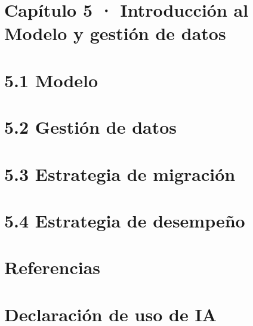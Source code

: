 \documentclass[11pt]{article}
\begin{document}
\tableofcontents
\clearpage

\section{Capítulo 5 · Introducción al Modelo y gestión de datos}\label{capuxedtulo-5-introducciuxf3n-al-modelo-y-gestiuxf3n-de-datos}

\section{5.1 Modelo}\label{modelo}

\section{5.2 Gestión de datos}\label{gestiuxf3n-de-datos}

\section{5.3 Estrategia de migración}\label{estrategia-de-migraciuxf3n}

\section{5.4 Estrategia de desempeño}\label{estrategia-de-desempeuxf1o}

\section*{Referencias}

\section*{Declaración de uso de IA}

\ossFinalPage
\end{document}
